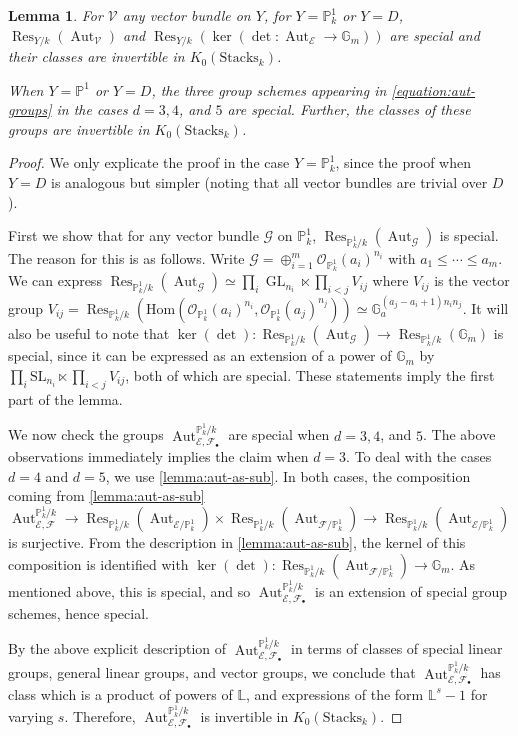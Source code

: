 \documentclass[12 pt]{amsart}
\theoremstyle{plain}
\newtheorem{lemma}[theorem]{Lemma}
\theoremstyle{definition}
\theoremstyle{remark}
\numberwithin{equation}{section}
\newcommand\bg{\mathbb G}
\newcommand\bl{\mathbb L}
\newcommand\bp{\mathbb P}
\newcommand\sce{\mathscr E}
\newcommand\scf{\mathscr F}
\newcommand\scg{\mathscr G}
\newcommand\sco{\mathscr O}
\newcommand\scv{\mathscr V}
\DeclareMathOperator\res{Res}
\newcommand\grStacks{K_0(\mathrm{Stacks}_k)} %
\renewcommand\hom{\mathrm{Hom}}
\DeclareMathOperator\aut{Aut}
\DeclareMathOperator\gl{GL}
\renewcommand\sl{\mathrm{SL}}
\begin{document}
\begin{lemma} \label{lemma:special-auts} For $\scv$ any vector bundle on $Y$,
	for $Y = \bp^1_k$ or $Y = D$, $\res_{Y/k}(\aut_{\scv})$ and
	$\res_{Y/k}(\ker(\det: \aut_{\sce} \to \bg_m))$ are special and their
	classes are invertible in $\grStacks$.

	When $Y = \bp^1$ or $Y = D$, the three
	group schemes appearing in \autoref{equation:aut-groups} in the cases $d
	= 3, 4$, and $5$ are special.  Further, the classes of these groups are
	invertible in $\grStacks$.  \end{lemma} 
	\begin{proof} We only explicate
		the proof in the case $Y= \bp^1_k$, since the proof when $Y = D$
		is analogous but simpler (noting that all vector bundles are
		trivial over $D$).  
		
		First we show that for any vector bundle $\scg$
		on $\bp^1_k$, $\res_{\bp^1_k/k}(\aut_{\scg})$ is special.  The
		reason for this is as follows.
		Write $\scg = \oplus_{i=1}^m
		\sco_{\bp^1_k}(a_i)^{n_i}$ with $a_1 \leq \cdots \leq a_m$.
		We can express
		$\res_{\bp^1_k/k}(\aut_{\scg}) \simeq \prod_i \gl_{n_i} \ltimes
		\prod_{i<j} V_{ij}$ where $V_{ij}$ is the vector group $V_{ij} =
		\res_{\bp^1_k/k}(\hom(\sco_{\bp^1_k}(a_i)^{n_i},
		\sco_{\bp^1_k}(a_j)^{n_j})) \simeq \bg_a^{(a_j - a_i+1)n_i
		n_j}$.  It will also be useful to note that $\ker(\det) :
		\res_{\bp^1_k/k}(\aut_{\scg} )\to \res_{\bp^1_k/k}(\bg_m)$ is special, since it
		can be expressed as an extension of a power of $\bg_m$ by
		$\prod_i \sl_{n_i} \ltimes \prod_{i<j} V_{ij}$, both of which are
		special.  These statements imply the first part of the lemma.

	We now check the groups $\aut^{\bp^1_k/k}_{\sce, \scf_\bullet}$
	are special when $d = 3,4$, and $5$.
	The above observations immediately implies the claim when $d = 3.$ To deal with
	the cases $d =4$ and $d =5$, we use \autoref{lemma:aut-as-sub}.  In both
	cases, the composition coming from \autoref{lemma:aut-as-sub}
	$\aut_{\sce, \scf}^{\bp^1_k/k} \to \res_{\bp^1_k/k}(\aut_{\sce/\bp^1_k}) \times
	\res_{\bp^1_k/k}(\aut_{\scf/\bp^1_k}) \to
	\res_{\bp^1_k/k}(\aut_{\sce/\bp^1_k})$ is surjective.
	From the description in \autoref{lemma:aut-as-sub}, the kernel of this
	composition is identified with $\ker (\det) :
	\res_{\bp^1_k/k}(\aut_{\scf/\bp^1_k})
	\to \bg_m$.  As mentioned above, this is special, and so
	$\aut^{\bp^1_k/k}_{\sce, \scf_\bullet}$ is an extension of special group
	schemes, hence special.

By the above explicit description of $\aut^{\bp^1_k/k}_{\sce, \scf_\bullet}$ in
terms of classes of special linear groups, general linear groups, and vector
groups, we conclude that 
$\aut^{\bp^1_k/k}_{\sce, \scf_\bullet}$
has class which is a product of powers of $\bl$, and
expressions of the form $\bl^s - 1$ for varying $s$. 
Therefore,
$\aut^{\bp^1_k/k}_{\sce, \scf_\bullet}$
is invertible in
$\grStacks$.  \end{proof}
\end{document}
